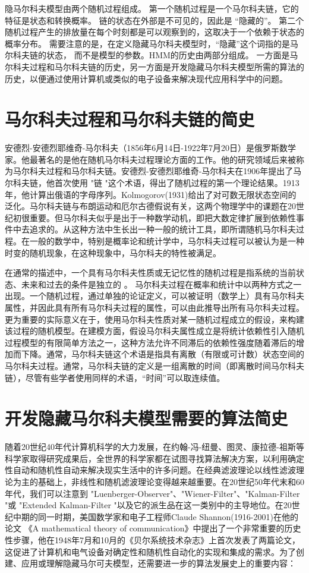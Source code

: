 \documentclass[degree=project, degree-type=project]{thuthesis}
\begin{document}
隐马尔科夫模型由两个随机过程组成。
第一个随机过程是一个马尔科夫链，它的特征是状态和转换概率。
链的状态在外部是不可见的，因此是 “隐藏的”。
第二个随机过程产生的排放量在每个时刻都是可以观察到的，这取决于一个依赖于状态的概率分布。
需要注意的是，在定义隐藏马尔科夫模型时，“隐藏”这个词指的是马尔科夫链的状态，
而不是模型的参数。HMM的历史由两部分组成。
一方面是马尔科夫过程和马尔科夫链的历史，另一方面是开发隐藏马尔科夫模型所需的算法的历史，以便通过使用计算机或类似的电子设备来解决现代应用科学中的问题。

\section{马尔科夫过程和马尔科夫链的简史}

安德烈-安德烈耶维奇-马尔科夫（1856年6月14日-1922年7月20日）是俄罗斯数学家。他最著名的是他在随机马尔科夫过程理论方面的工作。他的研究领域后来被称为马尔科夫过程和马尔科夫链。安德烈-安德烈耶维奇-马尔科夫在1906年提出了马尔科夫链，他首次使用 "链 "这个术语，得出了随机过程的第一个理论结果。1913年，他计算出俄语的字母序列。Kolmogorov(1931)给出了对可数无限状态空间的泛化。马尔科夫链与布朗运动和厄尔古德假说有关，这两个物理学中的课题在20世纪初很重要。但马尔科夫似乎是出于一种数学动机，即把大数定律扩展到依赖性事件中去追求的。从这种方法中生长出一种一般的统计工具，即所谓随机马尔科夫过程。在一般的数学中，特别是概率论和统计学中，马尔科夫过程可以被认为是一种时变的随机现象，在这种现象中，马尔科夫的特性被满足。

在通常的描述中，一个具有马尔科夫性质或无记忆性的随机过程是指系统的当前状态、未来和过去的条件是独立的 。
马尔科夫过程在概率和统计中以两种方式之一出现。一个随机过程，通过单独的论证定义，可以被证明（数学上）具有马尔科夫属性，并因此具有所有马尔科夫过程的属性，可以由此推导出所有马尔科夫过程。更为重要的实际意义在于，使用马尔科夫性质对某一随机过程成立的假设，来构建该过程的随机模型。在建模方面，假设马尔科夫属性成立是将统计依赖性引入随机过程模型的有限简单方法之一，这种方法允许不同滞后的依赖性强度随着滞后的增加而下降。通常，马尔科夫链这个术语是指具有离散（有限或可计数）状态空间的马尔科夫过程。通常，马尔科夫链的定义是一组离散的时间（即离散时间马尔科夫链），尽管有些学者使用同样的术语，“时间”可以取连续值。

\section{开发隐藏马尔科夫模型需要的算法简史}

随着20世纪40年代计算机科学的大力发展，在约翰-冯-纽曼、图灵、康拉德-祖斯等科学家取得研究成果后，全世界的科学家都在试图寻找算法解决方案，以利用确定性自动和随机性自动来解决现实生活中的许多问题。在经典滤波理论以线性滤波理论为主的基础上，非线性和随机滤波理论变得越来越重要。在20世纪50年代末和60年代，我们可以注意到 "Luenberger-Observer"、"Wiener-Filter"、"Kalman-Filter "或 "Extended Kalman-Filter "以及它的派生品在这一类别中的主导地位。在20世纪中期的同一时期，美国数学家和电子工程师Claude Shannon(1916-2001)在他的论文 《A mathematical theory of communication》中提出了一个非常重要的历史性步骤，他在1948年7月和10月的《贝尔系统技术杂志》上首次发表了两篇论文，这促进了计算机和电气设备对确定性和随机性自动化的实现和集成的需求。为了创建、应用或理解隐藏马尔可夫模型，还需要进一步的算法发展史上的重要内容：
\end{document}
